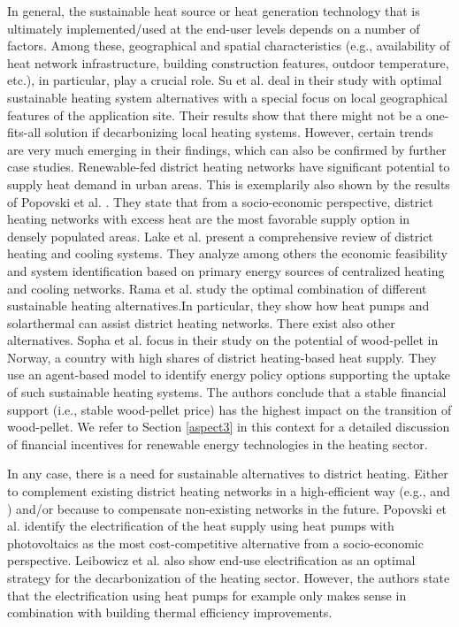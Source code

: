In general, the sustainable heat source or heat generation technology that is ultimately implemented/used at the end-user levels depends on a number of factors. Among these, geographical and spatial characteristics (e.g., availability of heat network infrastructure, building construction features, outdoor temperature, etc.), in particular, play a crucial role. Su et al. \cite{su2018heating} deal in their study with optimal sustainable heating system alternatives with a special focus on local geographical features of the application site. Their results show that there might not be a one-fits-all solution if decarbonizing local heating systems. However, certain trends are very much emerging in their findings, which can also be confirmed by further case studies. Renewable-fed district heating networks have significant potential to supply heat demand in urban areas. This is exemplarily also shown by the results of Popovski et al. \cite{popovski2018technical}. They state that from a socio-economic perspective, district heating networks with excess heat are the most favorable supply option in densely populated areas. Lake et al. \cite{lake2017review} present a comprehensive review of district heating and cooling systems. They analyze among others the economic feasibility and system identification based on primary energy sources of centralized heating and cooling networks. Rama et al. \cite{rama2018introduction} study the optimal combination of different sustainable heating alternatives.In particular, they show how heat pumps and solarthermal can assist district heating networks. There exist also other alternatives. Sopha et al. \cite{sopha2011exploring} focus in their study on the potential of wood-pellet in Norway, a country with high shares of district heating-based heat supply. They use an agent-based model to identify energy policy options supporting the uptake of such sustainable heating systems. The authors conclude that a stable financial support (i.e., stable wood-pellet price) has the highest impact on the transition of wood-pellet. We refer to Section \ref{aspect3} in this context for a detailed discussion of financial incentives for renewable energy technologies in the heating sector.\vspace{0.5cm}

In any case, there is a need for sustainable alternatives to district heating. Either to complement existing district heating networks in a high-efficient way (e.g., \cite{rama2018introduction} and \cite{sopha2011exploring}) and/or because to compensate non-existing networks in the future. Popovski et al. \cite{popovski2018technical} identify the electrification of the heat supply using heat pumps with photovoltaics as the most cost-competitive alternative from a socio-economic perspective. Leibowicz et al. \cite{leibowicz2018optimal} also show end-use electrification as an optimal strategy for the decarbonization of the heating sector. However, the authors state that the electrification using heat pumps for example only makes sense in combination with building thermal efficiency improvements.\vspace{0.5cm}

